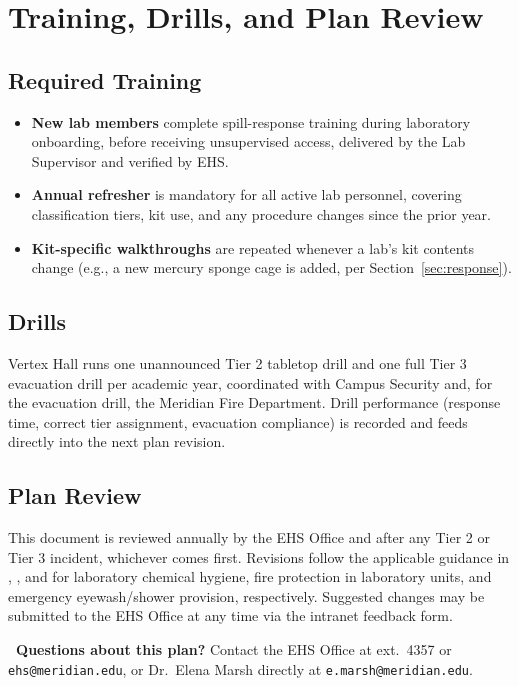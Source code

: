 
\section{Training, Drills, and Plan Review}

\subsection*{Required Training}
\begin{itemize}
  \item \textbf{New lab members} complete spill-response training during laboratory onboarding,
        before receiving unsupervised access, delivered by the Lab Supervisor and verified by
        EHS.
  \item \textbf{Annual refresher} is mandatory for all active lab personnel, covering
        classification tiers, kit use, and any procedure changes since the prior year.
  \item \textbf{Kit-specific walkthroughs} are repeated whenever a lab's kit contents change
        (e.g., a new mercury sponge cage is added, per Section~\ref{sec:response}).
\end{itemize}

\subsection*{Drills}
Vertex Hall runs one unannounced Tier 2 tabletop drill and one full Tier 3 evacuation drill per
academic year, coordinated with Campus Security and, for the evacuation drill, the Meridian Fire
Department. Drill performance (response time, correct tier assignment, evacuation compliance) is
recorded and feeds directly into the next plan revision.

\subsection*{Plan Review}
This document is reviewed annually by the EHS Office and after any Tier 2 or Tier 3 incident,
whichever comes first. Revisions follow the applicable guidance in
\cite{osha1910_1450}, \cite{nfpa45_2024}, and \cite{ansi_z358_2020} for laboratory chemical
hygiene, fire protection in laboratory units, and emergency eyewash/shower provision,
respectively. Suggested changes may be submitted to the EHS Office at any time via the intranet
feedback form.

\begin{notebox}
\textbf{\hazicon{\faInfoCircle}\ Questions about this plan?} Contact the EHS Office at
ext.\ 4357 or \texttt{ehs@meridian.edu}, or Dr.\ Elena Marsh directly at
\texttt{e.marsh@meridian.edu}.
\end{notebox}
